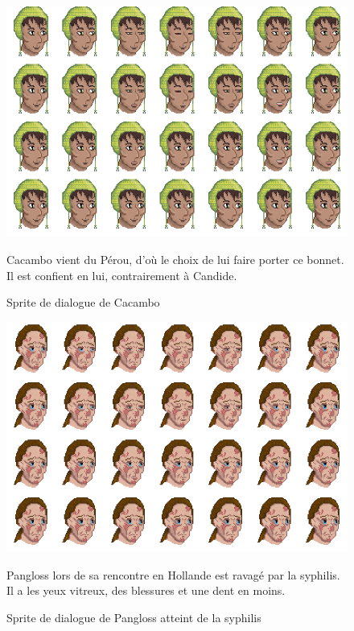 \documentclass[11pt]{article}
\begin{document}
\begin{appendices}
\begin{figure}[H]
\includegraphics[scale=0.4]{cacamboFaceAnimation}
\centering
\caption{Sprite de dialogue de Cacambo}
Cacambo vient du Pérou, d'où le choix de lui faire porter ce bonnet. Il est confient en lui, contrairement à Candide.
\end{figure}

\begin{figure}[H]
\includegraphics[scale=0.4]{panglossSyphilisFaceAnimation}
\centering
\caption{Sprite de dialogue de Pangloss atteint de la syphilis}
Pangloss lors de sa rencontre en Hollande est ravagé par la syphilis. Il a les yeux vitreux, des blessures et une dent en moins.
\end{figure}


\end{appendices}
\end{document}
